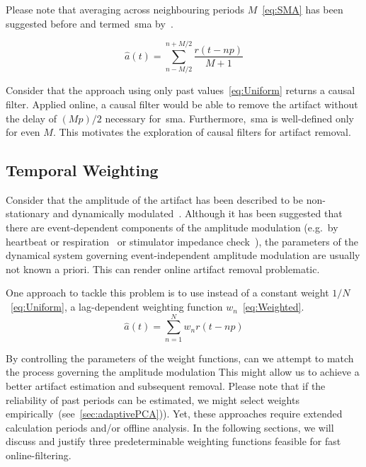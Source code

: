 \documentclass[a4paper]{article}
\newcommand{\secref}[1]{(see~\ref{#1})}
\begin{document}
Please note that averaging across neighbouring periods $M$~\eqref{eq:SMA} has been suggested before and termed~\gls{sma} by~\cite{Kohli_2015}.

\begin{equation}
    \hat{a}(t) = \sum_{n-M/2}^{n+M/2} \frac{r(t - np)}{M+1}\label{eq:SMA}
\end{equation}

Consider that the approach using only past values~\eqref{eq:Uniform} returns a causal filter. Applied online, a causal filter would be able to remove the artifact without the delay of $(Mp)/2$ necessary for~\gls{sma}. Furthermore,~\gls{sma} is well-defined only for even $M$. This motivates the exploration of causal filters for artifact removal.

\subsection{Temporal Weighting}

Consider that the amplitude of the  artifact has been described to be non-stationary and dynamically modulated~\citep{Noury_2016,Neuling_2017}.
Although it has been suggested that there are event-dependent components of the amplitude modulation (e.g.\ by heartbeat or respiration~\cite{Noury_2016} or stimulator impedance check~\cite{Neuling_2017}), the parameters of the dynamical system governing event-independent amplitude modulation are usually not known a priori. This can render online artifact removal problematic.

One approach to tackle this problem is to use instead of a constant weight $1/N$~\eqref{eq:Uniform}, a lag-dependent weighting function $w_n$~\eqref{eq:Weighted}.
\begin{equation}
    \hat{a}(t) = \sum_{n=1}^{N} w_n r(t - np)\label{eq:Weighted}
\end{equation}

By controlling the parameters of the weight functions, can we attempt to match the process governing the amplitude modulation
This might allow us to achieve a better artifact estimation and subsequent removal. Please note that if the reliability of past periods can be estimated, we might select weights empirically~\secref{sec:adaptivePCA}).
Yet, these approaches require extended calculation periods and/or offline analysis. In the following sections, we will discuss and justify three predeterminable weighting functions feasible for fast online-filtering.
\end{document}
